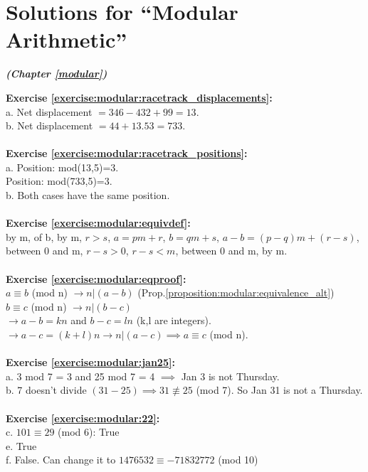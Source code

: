 \section{Solutions for ``Modular Arithmetic''}
\noindent \textbf{\textit{ (Chapter \ref{modular})}}\bigskip

\noindent\textbf{Exercise \ref{exercise:modular:racetrack_displacements}:}\\
a. Net displacement $=346-432+99=13$.\\
b. Net displacement $=44+13.53=733$.\\
\\
\textbf{Exercise \ref{exercise:modular:racetrack_positions}:}\\
a. Position: mod(13,5)=3.\\
   Position: mod(733,5)=3.\\
b. Both cases have the same position.\\
\\
\textbf{Exercise \ref{exercise:modular:equivdef}:}\\
by m, of b, by m, $r>s$, $a=pm+r$, $b=qm+s$, $a-b=(p-q)m+(r-s)$, between 0 and m, $r-s>0$, $r-s<m$, between 0 and m, by m.\\
\\
\textbf{Exercise \ref{exercise:modular:eqproof}:}\\
$a \equiv b$ (mod n) $\rightarrow n|(a-b)$ (Prop.\ref{proposition:modular:equivalence_alt})\\
$b \equiv c$ (mod n) $\rightarrow n|(b-c)$\\
$\rightarrow a-b=kn$ and $ b-c=ln$ (k,l are integers).\\
$\rightarrow a-c=(k+l)n \rightarrow n|(a-c) \implies a \equiv c$ (mod n).\\
\\
\textbf{Exercise \ref{exercise:modular:jan25}:}\\
a. 3 mod 7 = 3 and 25 mod 7 = 4 $\implies$  Jan 3 is not Thursday.\\
b. 7 doesn't divide $(31 - 25) \implies 31 \not\equiv 25$ (mod 7). So Jan 31 is not a Thursday.\\
\\
\textbf{Exercise \ref{exercise:modular:22}:}\\
c. $101 \equiv 29$ (mod 6): True\\
e. True\\
f. False. Can change it to $1476532 \equiv -71832772$ (mod 10)\\
\\

